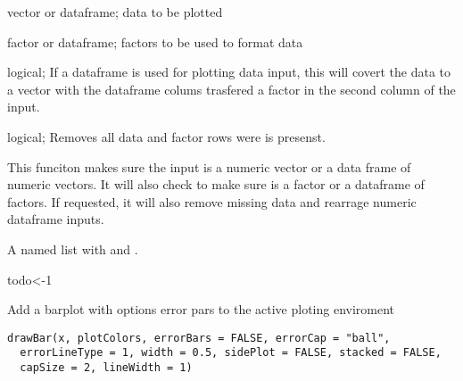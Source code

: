 \documentclass[a4paper]{book}
\begin{document}
\begin{Arguments}
\begin{ldescription}
\item[\code{data}] vector or dataframe; data to be plotted

\item[\code{by}] factor or dataframe; factors to be used to format data

\item[\code{flipFacts}] logical; If a dataframe is used for plotting data input, this will covert the data to a vector with the dataframe colums trasfered a factor in the second column of the  input.

\item[\code{na.rm}] logical; Removes all data and factor rows were  is presenst.
\end{ldescription}
\end{Arguments}
%
\begin{Details}\relax
This funciton makes sure the  input is a numeric vector or a data frame of numeric vectors.
It will also check to make sure  is a factor or a dataframe of factors. If requested, it will also remove missing data and rearrage numeric dataframe inputs.
\end{Details}
%
\begin{Value}
A named list with  and .
\end{Value}
%
\begin{Examples}
\begin{ExampleCode}
todo<-1

\end{ExampleCode}
\end{Examples}
%
\begin{Description}\relax
Add a barplot with options error pars to the active ploting enviroment
\end{Description}
%
\begin{Usage}
\begin{verbatim}
drawBar(x, plotColors, errorBars = FALSE, errorCap = "ball",
  errorLineType = 1, width = 0.5, sidePlot = FALSE, stacked = FALSE,
  capSize = 2, lineWidth = 1)
\end{verbatim}
\end{Usage}
%
\end{document}

